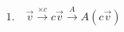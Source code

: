 \documentclass[preview]{standalone}
\begin{document}
\begin{align*}
1.\quad \vec{v}\xrightarrow{\times c}c\vec{v}\xrightarrow{A}A(c\vec{v})
\end{align*}
\end{document}
